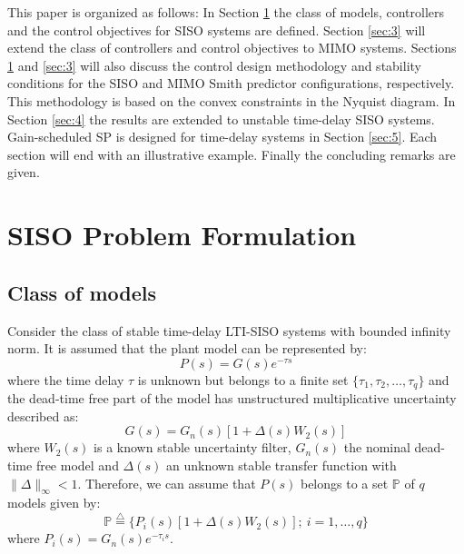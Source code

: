 \documentclass[default]{svmult}
\begin{document}

This paper is organized as follows: In Section \ref{sec:2} the class of models, controllers and the control objectives for SISO systems are
defined. Section \ref{sec:3} will extend the class of controllers and control objectives to MIMO systems. Sections \ref{sec:2} and \ref{sec:3} will also discuss the control design methodology and stability conditions for the SISO and MIMO Smith predictor configurations, respectively. This methodology is based on the convex constraints in the Nyquist diagram. In Section \ref{sec:4} the results are extended to unstable time-delay SISO systems. Gain-scheduled SP is designed for time-delay systems in Section \ref{sec:5}. Each section will end with an illustrative example. Finally the concluding remarks are given. 


\section{SISO Problem Formulation}
\label{sec:2}
\subsection{Class of models}
Consider the class of stable time-delay LTI-SISO systems with bounded infinity norm. It is assumed that the plant model can be represented by:
\begin{equation}\label{model}
P(s)=G(s)e^{-\tau s}
\end{equation}
where the time delay $\tau$  is unknown but belongs to a finite set $\{\tau_1, \tau_2, \ldots, \tau_q \}$ and the dead-time free part of the model has unstructured multiplicative uncertainty described as:
\begin{equation}\label{uncertainty}
G(s)=G_n(s)[1+\Delta(s) W_2(s)]
\end{equation}
where $W_2(s)$ is a known stable uncertainty filter, $G_n(s)$ the nominal dead-time free model and  $\Delta(s)$  an unknown stable transfer function with $\| \Delta\|_{\infty}<1$.  
Therefore, we can assume that $P(s)$ belongs to a set $\mathbb{P}$ of $q$ models given by:
\begin{equation}
\mathbb{P}\stackrel{\triangle}{=}\{ P_i(s)[1+\Delta(s) W_2(s)]; \: i=1,\dots, q \}
\label{setP}
\end{equation}
where $P_i(s)=G_n(s)e^{-\tau_i s}$.
\end{document}
